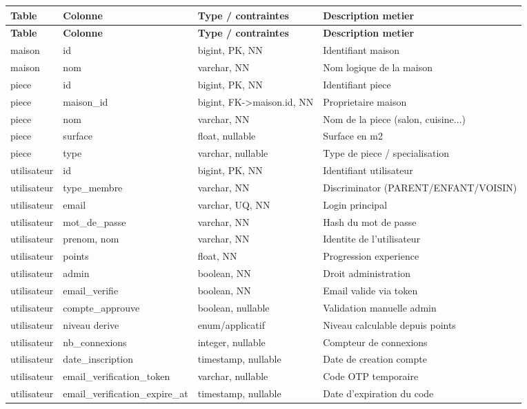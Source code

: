 \documentclass[11pt,a4paper]{article}
\begin{document}
\begin{longtable}{|p{3.0cm}|p{4.0cm}|p{4.1cm}|p{4.7cm}|}
\hline
\textbf{Table} & \textbf{Colonne} & \textbf{Type / contraintes} & \textbf{Description metier} \\
\hline
\endfirsthead
\hline
\textbf{Table} & \textbf{Colonne} & \textbf{Type / contraintes} & \textbf{Description metier} \\
\hline
\endhead

maison & id & bigint, PK, NN & Identifiant maison \\
\hline
maison & nom & varchar, NN & Nom logique de la maison \\
\hline

piece & id & bigint, PK, NN & Identifiant piece \\
\hline
piece & maison\_id & bigint, FK->maison.id, NN & Proprietaire maison \\
\hline
piece & nom & varchar, NN & Nom de la piece (salon, cuisine...) \\
\hline
piece & surface & float, nullable & Surface en m2 \\
\hline
piece & type & varchar, nullable & Type de piece / specialisation \\
\hline

utilisateur & id & bigint, PK, NN & Identifiant utilisateur \\
\hline
utilisateur & type\_membre & varchar, NN & Discriminator (PARENT/ENFANT/VOISIN) \\
\hline
utilisateur & email & varchar, UQ, NN & Login principal \\
\hline
utilisateur & mot\_de\_passe & varchar, NN & Hash du mot de passe \\
\hline
utilisateur & prenom, nom & varchar, NN & Identite de l'utilisateur \\
\hline
utilisateur & points & float, NN & Progression experience \\
\hline
utilisateur & admin & boolean, NN & Droit administration \\
\hline
utilisateur & email\_verifie & boolean, NN & Email valide via token \\
\hline
utilisateur & compte\_approuve & boolean, nullable & Validation manuelle admin \\
\hline
utilisateur & niveau derive & enum/applicatif & Niveau calculable depuis points \\
\hline
utilisateur & nb\_connexions & integer, nullable & Compteur de connexions \\
\hline
utilisateur & date\_inscription & timestamp, nullable & Date de creation compte \\
\hline
utilisateur & email\_verification\_token & varchar, nullable & Code OTP temporaire \\
\hline
utilisateur & email\_verification\_expire\_at & timestamp, nullable & Date d'expiration du code \\
\hline


\end{longtable}
\end{document}
